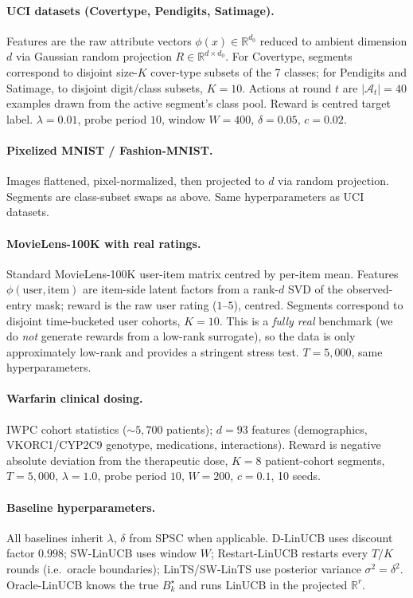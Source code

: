 \documentclass{article}
\newcommand{\R}{\mathbb{R}}
\newcommand{\cA}{\mathcal{A}}
\begin{document}
\paragraph{UCI datasets (Covertype, Pendigits, Satimage).}
Features are the raw attribute vectors $\phi(x)\in\R^{d_0}$ reduced to
ambient dimension $d$ via Gaussian random projection
$R\in\R^{d\times d_0}$. For Covertype, segments correspond to disjoint
size-$K$ cover-type subsets of the 7 classes; for Pendigits and
Satimage, to disjoint digit/class subsets, $K=10$. Actions at round
$t$ are $|\cA_t|=40$ examples drawn from the active segment's class
pool. Reward is centred target label. $\lambda=0.01$, probe
period $10$, window $W=400$, $\delta=0.05$, $c=0.02$.

\paragraph{Pixelized MNIST / Fashion-MNIST.}
Images flattened, pixel-normalized, then projected to $d$ via random
projection. Segments are class-subset swaps as above. Same
hyperparameters as UCI datasets.

\paragraph{MovieLens-100K with real ratings.}
Standard MovieLens-100K user-item matrix centred by per-item mean.
Features $\phi(\text{user},\text{item})$ are item-side latent
factors from a rank-$d$ SVD of the observed-entry mask; reward is
the raw user rating ($1$--$5$), centred. Segments correspond to
disjoint time-bucketed user cohorts, $K=10$. This is a
\emph{fully real} benchmark (we do \emph{not} generate rewards from
a low-rank surrogate), so the data is only approximately low-rank and
provides a stringent stress test. $T=5{,}000$, same hyperparameters.

\paragraph{Warfarin clinical dosing.}
IWPC cohort statistics (${\sim}5{,}700$ patients); $d=93$ features
(demographics, VKORC1/CYP2C9 genotype, medications, interactions).
Reward is negative absolute deviation from the therapeutic dose,
$K=8$ patient-cohort segments, $T=5{,}000$, $\lambda=1.0$, probe
period $10$, $W=200$, $c=0.1$, 10 seeds.

\paragraph{Baseline hyperparameters.}
All baselines inherit $\lambda$, $\delta$ from SPSC when applicable.
D-LinUCB uses discount factor $0.998$; SW-LinUCB uses window $W$;
Restart-LinUCB restarts every $T/K$ rounds (i.e.\ oracle boundaries);
LinTS/SW-LinTS use posterior variance $\sigma^2 = \delta^2$.
Oracle-LinUCB knows the true $B_k^\star$ and runs LinUCB in the
projected $\R^r$.
\end{document}
